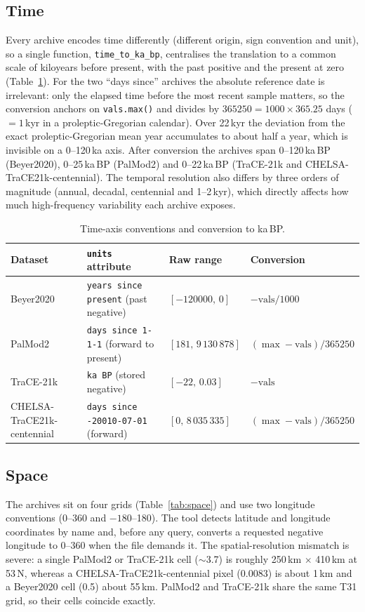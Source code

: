 \documentclass{isprs}
\newcommand{\dg}{\textdegree}
\newcommand{\tabbr}[1]{\texttt{#1}}
\newcommand{\kaBP}{ka\,BP}
\begin{document}
\subsection{Time}
Every archive encodes time differently (different origin, sign convention and unit), so a single function, \tabbr{time\_to\_ka\_bp}, centralises the translation to a common scale of kiloyears before present, with the past positive and the present at zero (Table~\ref{tab:time}). For the two ``days since'' archives the absolute reference date is irrelevant: only the elapsed time before the most recent sample matters, so the conversion anchors on \tabbr{vals.max()} and divides by $365250 = 1000\times365.25$ days ($=1$\,kyr in a proleptic-Gregorian calendar). Over 22\,kyr the deviation from the exact proleptic-Gregorian mean year accumulates to about half a year, which is invisible on a 0--120\,ka axis. After conversion the archives span 0--120\,\kaBP{} (Beyer2020), 0--25\,\kaBP{} (PalMod2) and 0--22\,\kaBP{} (TraCE-21k and CHELSA-TraCE21k-centennial). The temporal resolution also differs by three orders of magnitude (annual, decadal, centennial and 1--2\,kyr), which directly affects how much high-frequency variability each archive exposes.

\begin{table}[t]
\centering
\small
\begin{tabular}{llll}
\toprule
Dataset						& \tabbr{units} attribute                       & Raw range             & Conversion \\
\midrule
Beyer2020					& \tabbr{years since present} (past negative)   & $[-120000,\,0]$       & $-\mathrm{vals}/1000$ \\
PalMod2						& \tabbr{days since 1-1-1} (forward to present) & $[181,\,9\,130\,878]$ & $(\max-\mathrm{vals})/365250$ \\
TraCE-21k					& \tabbr{ka BP} (stored negative)               & $[-22,\,0.03]$        & $-\mathrm{vals}$ \\
CHELSA-TraCE21k-centennial	& \tabbr{days since -20010-07-01} (forward)     & $[0,\,8\,035\,335]$   & $(\max-\mathrm{vals})/365250$ \\
\bottomrule
\end{tabular}
\caption{Time-axis conventions and conversion to \kaBP.}
\label{tab:time}
\end{table}

\subsection{Space}
The archives sit on four grids (Table~\ref{tab:space}) and use two longitude conventions (0--360\dg{} and $-180$--180\dg). The tool detects latitude and longitude coordinates by name and, before any query, converts a requested negative longitude to 0--360\dg{} when the file demands it. The spatial-resolution mismatch is severe: a single PalMod2 or TraCE-21k cell ($\sim$3.7\dg) is roughly 250\,km $\times$ 410\,km at 53\dg\,N, whereas a CHELSA-TraCE21k-centennial pixel (0.0083\dg) is about 1\,km and a Beyer2020 cell (0.5\dg) about 55\,km. PalMod2 and TraCE-21k share the same T31 grid, so their cells coincide exactly.
\end{document}
